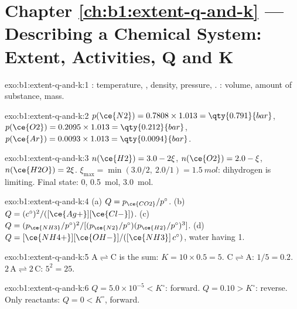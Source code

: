 \section*{Chapter \ref{ch:b1:extent-q-and-k} --- Describing a Chemical System: Extent, Activities, Q and K}

\begin{solution}{exo:b1:extent-q-and-k:1}
: temperature, , density, pressure, . : volume, amount of substance, mass.
\end{solution}

\begin{solution}{exo:b1:extent-q-and-k:2}
$p(\ce{N2}) = 0.7808 \times 1.013 = \qty{0.791}{bar}$, $p(\ce{O2}) =
0.2095 \times 1.013 = \qty{0.212}{bar}$, $p(\ce{Ar}) = 0.0093 \times 1.013
= \qty{0.0094}{bar}$.
\end{solution}

\begin{solution}{exo:b1:extent-q-and-k:3}
$n(\ce{H2}) = 3.0 - 2\xi$, $n(\ce{O2}) = 2.0 - \xi$, $n(\ce{H2O}) =
2\xi$. $\xi_{\max} = \min(3.0/2,\ 2.0/1) = \qty{1.5}{mol}$: dihydrogen is
limiting. Final state:  0,  \qty{0.5}{mol}, 
\qty{3.0}{mol}.
\end{solution}

\begin{solution}{exo:b1:extent-q-and-k:4}
(a) $Q = p_{\ce{CO2}}/p^\circ$. (b) $Q = (c^\circ)^2/([\ce{Ag+}][\ce{Cl-}])$.
(c) $Q = (p_{\ce{NH3}}/p^\circ)^2/[(p_{\ce{N2}}/p^\circ)(p_{\ce{H2}}/p^\circ)^3]$.
(d) $Q = [\ce{NH4+}][\ce{OH-}]/([\ce{NH3}]\,c^\circ)$, water having  1.
\end{solution}

\begin{solution}{exo:b1:extent-q-and-k:5}
$\mathrm{A \rightleftharpoons C}$ is the sum: $K = 10 \times 0.5 = 5$. $\mathrm{C \rightleftharpoons A}$: $1/5 =
0.2$. $\mathrm{2\,A \rightleftharpoons 2\,C}$: $5^2 = 25$.
\end{solution}

\begin{solution}{exo:b1:extent-q-and-k:6}
$Q = 5.0 \times 10^{-5} < K^\circ$: forward. $Q = 0.10 > K^\circ$: reverse.
Only reactants: $Q = 0 < K^\circ$, forward.
\end{solution}

